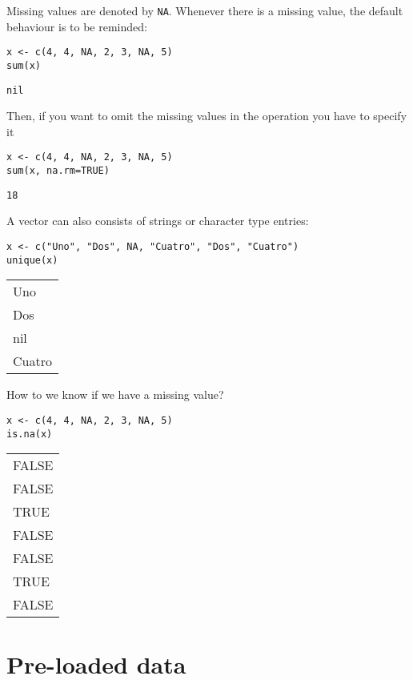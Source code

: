 \documentclass[11pt]{article}
\begin{document}
Missing values are denoted by \texttt{NA}. Whenever there is a missing value, the default behaviour is to be reminded:
\begin{verbatim}
x <- c(4, 4, NA, 2, 3, NA, 5)
sum(x)
\end{verbatim}

\begin{verbatim}
nil
\end{verbatim}


Then, if you want to omit the missing values in the operation you have to specify it
\begin{verbatim}
x <- c(4, 4, NA, 2, 3, NA, 5)
sum(x, na.rm=TRUE)
\end{verbatim}

\begin{verbatim}
18
\end{verbatim}


A vector can also consists of strings or character type entries:
\begin{verbatim}
x <- c("Uno", "Dos", NA, "Cuatro", "Dos", "Cuatro")
unique(x)
\end{verbatim}

\begin{center}
\begin{tabular}{l}
Uno\\
Dos\\
nil\\
Cuatro\\
\end{tabular}
\end{center}


How to we know if we have a missing value?
\begin{verbatim}
x <- c(4, 4, NA, 2, 3, NA, 5)
is.na(x)
\end{verbatim}

\begin{center}
\begin{tabular}{l}
FALSE\\
FALSE\\
TRUE\\
FALSE\\
FALSE\\
TRUE\\
FALSE\\
\end{tabular}
\end{center}


\section{Pre-loaded data}
\label{sec:org6af66e5}
\end{document}
